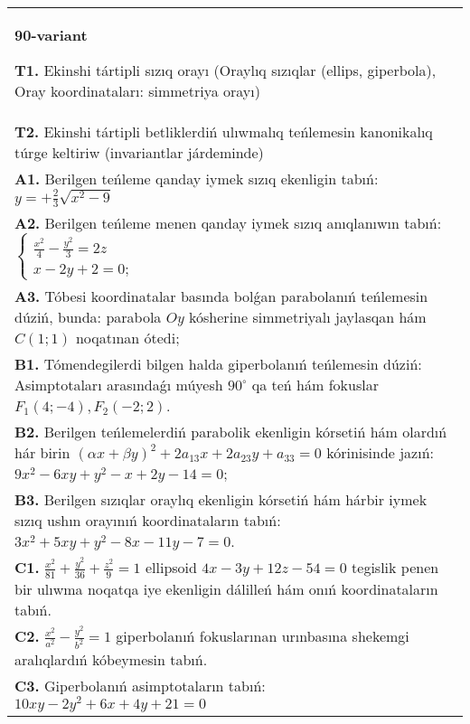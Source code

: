 \documentclass{article}
\begin{document}
\begin{tabular}{m{17cm}}
\textbf{90-variant}
\newline

\textbf{T1.} Ekinshi tártipli sızıq orayı (Oraylıq sızıqlar (ellips, giperbola), Oray koordinataları: simmetriya orayı) \\
\textbf{T2.} Ekinshi tártipli betliklerdiń ulıwmalıq teńlemesin kanonikalıq túrge keltiriw (invariantlar járdeminde) \\
\textbf{A1.} Berilgen teńleme qanday iymek sızıq ekenligin tabıń: $y=+\frac{2}{3} \sqrt{x^2-9}$ \\
\textbf{A2.} Berilgen teńleme menen qanday iymek sızıq anıqlanıwın tabıń: $\left\{\begin{array}{l}\frac{x^2}{4}-\frac{y^2}{3}=2 z \\ x-2 y+2=0 ;\end{array}\right.$ \\
\textbf{A3.} Tóbesi koordinatalar basında bolǵan parabolanıń teńlemesin dúziń, bunda: parabola $Oy$ kósherine simmetriyalı jaylasqan hám $C (1; 1) $ noqatınan ótedi; \\
\textbf{B1.} Tómendegilerdi bilgen halda giperbolanıń teńlemesin dúziń: Asimptotaları arasındaǵı múyesh $90^{\circ}$ qa teń hám fokuslar $F_1 (4;-4), F_2 (-2; 2) $. \\
\textbf{B2.} Berilgen teńlemelerdiń parabolik ekenligin kórsetiń hám olardıń hár birin $(\alpha x+\beta y)^2+2 a_{13} x+2 a_{23} y+a_{33}=0$ kórinisinde jazıń: $9 x^2-6 x y+y^2-x+2 y-14=0$; \\
\textbf{B3.} Berilgen sızıqlar oraylıq ekenligin kórsetiń hám hárbir iymek sızıq ushın orayınıń koordinataların tabıń: $3x^2+5xy+y^2-8x-11y-7=0$. \\
\textbf{C1.} $\frac{x^2}{81}+\frac{y^2}{36}+\frac{z^2}{9}=1$ ellipsoid $4 x-3 y+12 z-54=0$ tegislik penen bir ulıwma noqatqa iye ekenligin dálilleń hám onıń koordinataların tabıń. \\
\textbf{C2.} $\frac{x^2}{a^2}-\frac{y^2}{b^2}=1$ giperbolanıń fokuslarınan urınbasına shekemgi aralıqlardıń kóbeymesin tabıń. \\
\textbf{C3.} Giperbolanıń asimptotaların tabıń: $10 x y-2 y^2+6 x+4 y+21=0$ \\

\end{tabular}
\vspace{1cm}
\end{document}
